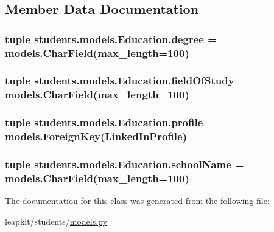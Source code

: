 \subsection{Member Data Documentation}
\hypertarget{classstudents_1_1models_1_1_education_a32495524f30233cc0f398a859edfc239}{
\subsubsection[{degree}]{\setlength{\rightskip}{0pt plus 5cm}tuple students.\-models.\-Education.\-degree = models.\-Char\-Field(max\-\_\-length=100)\hspace{0.3cm}{\ttfamily [static]}}}\label{classstudents_1_1models_1_1_education_a32495524f30233cc0f398a859edfc239}
\hypertarget{classstudents_1_1models_1_1_education_acd4a5b8574fb277183cc459776b58ec9}{
\subsubsection[{field\-Of\-Study}]{\setlength{\rightskip}{0pt plus 5cm}tuple students.\-models.\-Education.\-field\-Of\-Study = models.\-Char\-Field(max\-\_\-length=100)\hspace{0.3cm}{\ttfamily [static]}}}\label{classstudents_1_1models_1_1_education_acd4a5b8574fb277183cc459776b58ec9}
\hypertarget{classstudents_1_1models_1_1_education_a7f96253e2068278fe25499989c8dcdbe}{
\subsubsection[{profile}]{\setlength{\rightskip}{0pt plus 5cm}tuple students.\-models.\-Education.\-profile = models.\-Foreign\-Key({\bf Linked\-In\-Profile})\hspace{0.3cm}{\ttfamily [static]}}}\label{classstudents_1_1models_1_1_education_a7f96253e2068278fe25499989c8dcdbe}
\hypertarget{classstudents_1_1models_1_1_education_adf8328e588ab00fd0dc969f45410965d}{
\subsubsection[{school\-Name}]{\setlength{\rightskip}{0pt plus 5cm}tuple students.\-models.\-Education.\-school\-Name = models.\-Char\-Field(max\-\_\-length=100)\hspace{0.3cm}{\ttfamily [static]}}}\label{classstudents_1_1models_1_1_education_adf8328e588ab00fd0dc969f45410965d}


The documentation for this class was generated from the following file\-:\begin{DoxyCompactItemize}
\item 
leapkit/students/\hyperlink{models_8py}{models.\-py}\end{DoxyCompactItemize}
